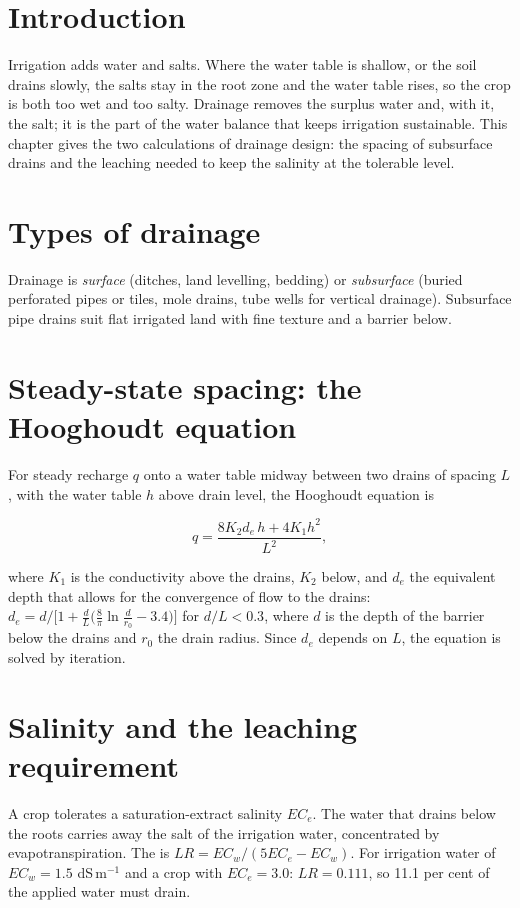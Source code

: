 \section{Introduction}
Irrigation adds water and salts. Where the water table is shallow, or the soil drains slowly, the salts stay in the root zone and the water table rises, so the crop is both too wet and too salty. Drainage removes the surplus water and, with it, the salt; it is the part of the water balance that keeps irrigation sustainable. This chapter gives the two calculations of drainage design: the spacing of subsurface drains and the leaching needed to keep the salinity at the tolerable level.

\section{Types of drainage}
Drainage is \emph{surface} (ditches, land levelling, bedding) or \emph{subsurface} (buried perforated pipes or tiles, mole drains, tube wells for vertical drainage). Subsurface pipe drains suit flat irrigated land with fine texture and a barrier below.

\section{Steady-state spacing: the Hooghoudt equation}
For steady recharge $q$ onto a water table midway between two drains of spacing $L$, with the water table $h$ above drain level, the Hooghoudt equation is

\begin{equation}q=\frac{8K_2d_e\,h+4K_1h^2}{L^2},\end{equation}


where $K_1$ is the conductivity above the drains, $K_2$ below, and $d_e$ the equivalent depth that allows for the convergence of flow to the drains: $d_e=d/\bigl[1+\frac{d}{L}\bigl(\frac{8}{\pi}\ln\frac{d}{r_0}-3.4\bigr)\bigr]$ for $d/L<0.3$, where $d$ is the depth of the barrier below the drains and $r_0$ the drain radius. Since $d_e$ depends on $L$, the equation is solved by iteration.

\section{Salinity and the leaching requirement}
A crop tolerates a saturation-extract salinity $EC_e$. The water that drains below the roots carries away the salt of the irrigation water, concentrated by evapotranspiration. The  is $LR=EC_w/(5EC_e-EC_w)$. For irrigation water of $EC_w=1.5$ dS\,m$^{-1}$ and a crop with $EC_e=3.0$: $LR=0.111$, so 11.1 per cent of the applied water must drain.

